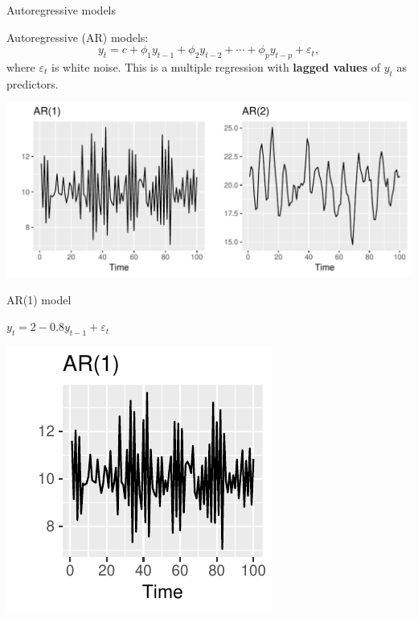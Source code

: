 \documentclass[14pt,ignorenonframetext,]{beamer}
\begin{document}
\begin{frame}{Autoregressive models}

\begin{block}{Autoregressive (AR) models:}
$$
  y_{t}  =  c  +  \phi_{1}y_{t - 1}  +  \phi_{2}y_{t - 2}  +  \cdots  +  \phi_{p}y_{t - p}  + \varepsilon_{t},
$$
where $\varepsilon_t$ is white noise.  This is a multiple regression with \textbf{lagged values} of $y_t$ as predictors.
\end{block}

\includegraphics{week_5_arima_files/figure-beamer/arp-1.pdf}

\end{frame}

\begin{frame}{AR(1) model}

\begin{block}{}
\centerline{$y_{t}    =   2 -0.8 y_{t - 1}  +  \varepsilon_{t}$}
\end{block}


\includegraphics[width=0.5\linewidth]{week_5_arima_files/figure-beamer/unnamed-chunk-20-1}

\end{frame}
\end{document}
